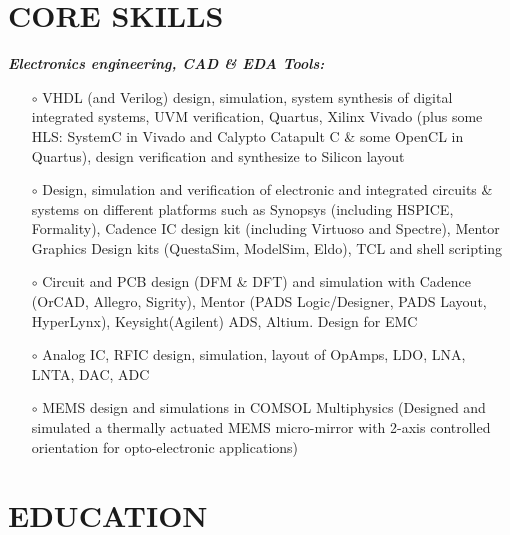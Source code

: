 \documentclass[margin , 10pt]{res} %
\begin{document}
\begin{resume}
		\section{CORE SKILLS}
		{\sl \textbf{Electronics engineering, CAD \& EDA Tools:}} \dotfill \vspace{2mm}
		\begin{itemize}
			\item[$\circ$] VHDL (and Verilog) design, simulation, system synthesis of digital integrated systems,  UVM verification, Quartus, Xilinx Vivado (plus some HLS: SystemC in Vivado and Calypto Catapult C \& some OpenCL in Quartus), design verification and synthesize to Silicon layout
			\item[$\circ$]  Design, simulation and verification of electronic and integrated circuits \& systems on different platforms such as Synopsys (including HSPICE, Formality), Cadence  IC design kit (including Virtuoso and Spectre), Mentor Graphics Design kits (QuestaSim, ModelSim, Eldo), TCL and shell scripting
			\item[$\circ$] Circuit and PCB design (DFM \& DFT) and simulation with Cadence (OrCAD, Allegro, Sigrity), Mentor (PADS Logic/Designer, PADS Layout, HyperLynx), Keysight(Agilent) ADS, Altium. Design for EMC
			\item[$\circ$] Analog IC, RFIC design, simulation, layout of OpAmps, LDO, LNA, LNTA, DAC, ADC
			\item[$\circ$] MEMS design and simulations in COMSOL Multiphysics (Designed and simulated a thermally actuated MEMS micro-mirror with 2-axis controlled orientation for opto-electronic applications) %
		\end{itemize} \vspace{-3mm}
		
		\section{EDUCATION}
		

\end{resume}
\end{document}
